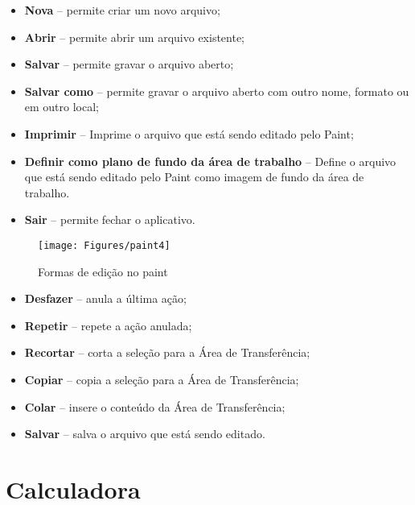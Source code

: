 \documentclass[hidelinks,12pt]{article}
\begin{document}
			\begin{itemize}
				\item {\bf Nova} – permite criar um novo arquivo;
				
				\item {\bf Abrir} – permite abrir um arquivo existente;
				
				\item {\bf Salvar} – permite gravar o arquivo aberto;
				
				\item {\bf Salvar como} – permite gravar o arquivo aberto com outro nome, formato ou em outro local;
				
				\item {\bf Imprimir} – Imprime o arquivo que está sendo editado pelo Paint;
				
				\item {\bf Definir como plano de fundo da área de trabalho} – Define o arquivo que está sendo editado pelo Paint como imagem de fundo da área de trabalho.
				
				\item {\bf Sair} – permite fechar o aplicativo.
			\end{itemize}
			\bigskip
			\begin{figure}[!h]
				\centering
				\texttt{[image: Figures/paint4]}
				\label{fig:paint4}
				\caption{Formas de edição no paint}
			\end{figure}
			
			\begin{itemize}
				\item {\bf Desfazer} – anula a última ação;
				
				\item {\bf Repetir} – repete a ação anulada;
				
				\item {\bf Recortar} – corta a seleção para a Área de Transferência;
				
				\item {\bf Copiar} – copia a seleção para a Área de Transferência;
				
				\item {\bf Colar} – insere o conteúdo da Área de Transferência;
				
				\item {\bf Salvar} – salva o arquivo que está sendo editado.
			\end{itemize}
			
			\section{Calculadora}
\end{document}
